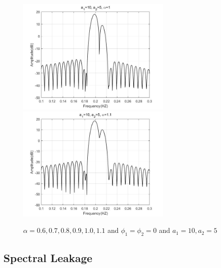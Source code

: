 \documentclass[UTF-8, a4paper, 12pt]{ctexart}
\begin{document}
\begin{figure}[htbp]
    \includegraphics[width=7.5cm]{2/dd10.jpg}
    \includegraphics[width=7.5cm]{2/dd11.jpg}
    \caption{$\alpha=  0.6,0.7,0.8,0.9,1.0,1.1$ and $\phi_1=\phi_2=0$ and $a_1=10, a_2=5$}
\end{figure}

\subsection{Spectral Leakage}
\end{document}
